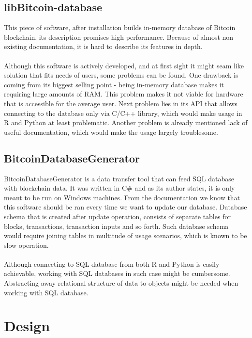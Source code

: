 \documentclass[12pt, en, eng, oneside, final]{mgr}
\begin{document}
\section{libBitcoin-database}

This piece of software\cite{libbitcoin-database}, after installation builds in-memory database of Bitcoin blockchain, its description promises high performance. Because of almost non existing documentation, it is hard to describe its features in depth.
\\
\\
Although this software is actively developed, and at first sight it might seam like solution that fits needs of users, some problems can be found. One drawback is coming from its biggest selling point - being in-memory database makes it requiring large amounts of RAM. This problem makes it not viable for hardware that is accessible for the average user. Next problem lies in its API that allows connecting to the database only via C/C++ library, which would make usage in R and Python at least problematic. Another problem is already mentioned lack of useful documentation, which would make the usage largely troublesome.

\section{BitcoinDatabaseGenerator}

BitcoinDatabaseGenerator\cite{BitcoinDatabaseGenerator} is a data transfer tool that can feed SQL database with blockchain data. It was written in C\# and as its author states, it is only meant to be run on Windows machines. From the documentation we know that this software should be ran every time we want to update our database. Database schema that is created after update operation, consists of separate tables for blocks, transactions, transaction inputs and so forth. Such database schema would require joining tables in multitude of usage scenarios, which is known to be slow operation.
\\
\\
Although connecting to SQL database from both R and Python is easily achievable, working with SQL databases in such case might be cumbersome. Abstracting away relational structure of data to objects might be needed when working with SQL database. 


\chapter{Design}
\end{document}
